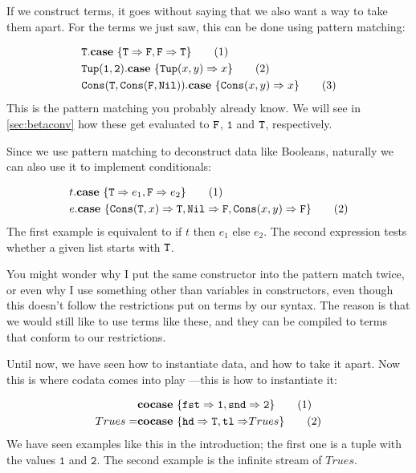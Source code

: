 \documentclass[twoside,12pt,a4paper]{article}
\begin{document}
If we construct terms, it goes without saying that we also want a way to take them apart. 
For the terms we just saw, this can be done using pattern matching:

\begin{example}
    \begin{align*}
        &\mathtt{T}.\textbf{case}\ \{\mathtt{T\Rightarrow F, F\Rightarrow T}\}\tag{1}\\
        &\mathtt{Tup(1,2)}.\textbf{case}\ \{\mathtt{Tup(}x, y\mathtt{)}\Rightarrow x\}\tag{2}\\
        &\mathtt{Cons(T, Cons(F, Nil))}.\textbf{case}\ \{\mathtt{Cons(}x, y\mathtt{)}\Rightarrow x\}\tag{3}   
    \end{align*}
    This is the pattern matching you probably already know. 
    We will see in \cref{sec:betaconv} how these get evaluated to $\mathtt{F}$, $\mathtt{1}$ and $\mathtt{T}$, respectively.
\end{example}

Since we use pattern matching to deconstruct data like Booleans, naturally we can also use it to implement conditionals:
\begin{example}
    \begin{align*}
        &t.\textbf{case}\ \{\mathtt{T}\Rightarrow e_1, \mathtt{F}\Rightarrow e_2\} \tag{1}\\
        &e.\textbf{case}\ \{\mathtt{Cons(}\mathtt{T}, x\mathtt{)}\Rightarrow \mathtt{T}, 
        \mathtt{Nil\Rightarrow F}, \mathtt{Cons(}x, y\mathtt{)}\Rightarrow\mathtt{F}\}\tag{2}
    \end{align*}
The first example is equivalent to if $t$ then $e_1$ else $e_2$. The second expression tests whether a given list starts with $\mathtt{T}$.

You might wonder why I put the same constructor into the pattern match twice, or even why I use something other than variables in constructors, 
even though this doesn't follow the restrictions put on terms by our syntax. 
The reason is that we would still like to use terms like these, and they can be compiled to terms that conform to our restrictions. \cite{10.1007/978-3-030-17184-1_5}
\end{example}

Until now, we have seen how to instantiate data, and how to take it apart. 
Now this is where codata comes into play ---this is how to instantiate it:

\begin{example}
    \begin{align*}
        &\textbf{cocase}\ \{\mathtt{fst\Rightarrow 1, snd\Rightarrow 2}\}\tag{1}\\
        Trues =& \textbf{cocase}\ \{\mathtt{hd \Rightarrow T, tl\Rightarrow}Trues\}\tag{2} 
    \end{align*}
    We have seen examples like this in the introduction; the first one is a tuple with the values $\mathtt{1}$ and $\mathtt{2}$.
    The second example is the infinite stream of $Trues$.
\end{example}
\end{document}
